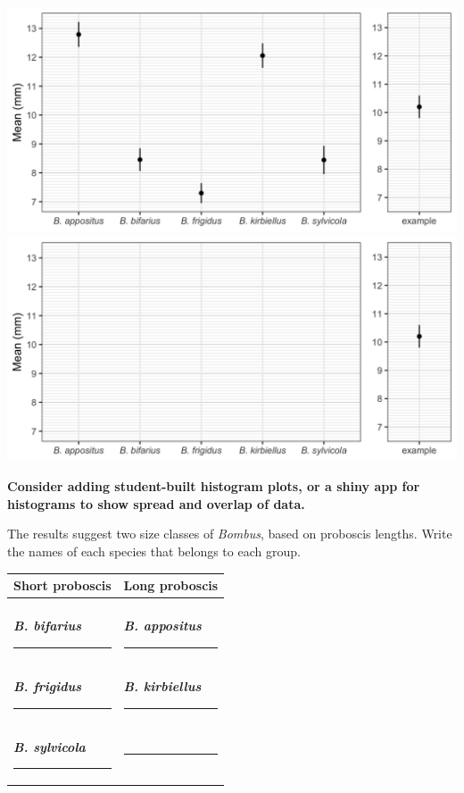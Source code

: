 \documentclass[12pt, hidelinks]{exam}
\begin{document}
\begin{questions}
\ifprintanswers
	\includegraphics[width=\textwidth]{mean_proboscis_plot_key}
\else
	\includegraphics[width=\textwidth]{mean_proboscis_plot_blank}
\fi

\textbf{Consider adding student-built histogram plots, or a shiny 
	app for histograms to show spread and overlap of data.}

\question
The results suggest two size classes of \textit{Bombus}, based on
proboscis lengths.  Write the names of each species that belongs to 
each group.

\begin{tabular}{@{}ll@{}} %
	\toprule
	Short proboscis & Long proboscis \tabularnewline
	\midrule
	& \tabularnewline
	\ifprintanswers \textbf{\textit{B. bifarius}} \else \rule{2in}{0.4pt} \fi &
	\ifprintanswers \textbf{\textit{B. appositus}} \else \rule{2in}{0.4pt} \fi 
	\tabularnewline[2em]
	\ifprintanswers \textbf{\textit{B. frigidus}} \else \rule{2in}{0.4pt} \fi &
	\ifprintanswers \textbf{\textit{B. kirbiellus}} \else \rule{2in}{0.4pt} \fi
	\tabularnewline[2em]
	\ifprintanswers \textbf{\textit{B. sylvicola}} \else \rule{2in}{0.4pt} \fi &
	\rule{1in}{0.4pt} \tabularnewline
	\bottomrule
\end{tabular}


\end{questions}
\end{document}
